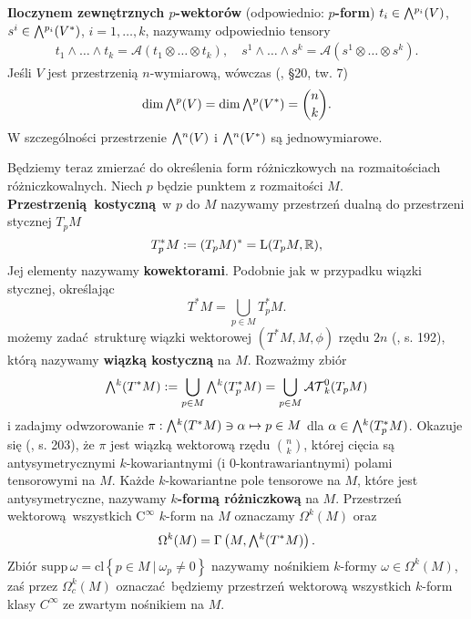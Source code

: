 \textbf{Iloczynem zewnętrznych \(p\)-wektorów} (odpowiednio: \textbf{\(p\)-form}) \(t_i\in\Exterior^{p_i}(V)\), \(s^i\in\Exterior^{p_i}(V^\ast)\), \(i=1,\dots, k\), nazywamy odpowiednio tensory
\begin{align*}
    t_1\wedge\dots\wedge t_k = \mathcal{A}(t_1\otimes \dots \otimes t_k), \quad 
    s^1\wedge\dots\wedge s^k = \mathcal{A}(s^1\otimes \dots \otimes s^k).
\end{align*}
Jeśli \(V\) jest przestrzenią \(n\)-wymiarową, wówczas (\cite{herdegen}, §20, tw. 7)
\begin{equation*}
    \mathrm{dim}\,\Exterior^p(V) = \mathrm{dim}\,\Exterior^p(V^\ast) = \binom{n}{k}.
\end{equation*}
W szczególności przestrzenie \(\Exterior^n(V)\) i \(\Exterior^n(V^\ast)\) są jednowymiarowe. 

Będziemy teraz zmierzać do określenia form różniczkowych na rozmaitościach różniczkowalnych. Niech \(p\) będzie punktem z rozmaitości \(M\). \textbf{Przestrzenią kostyczną} w \(p\) do \(M\) nazywamy przestrzeń dualną do przestrzeni stycznej \(T_p M\)
\begin{equation*}
    T^\ast_p M := (T_p M)^\ast = \mathrm{L}(T_p M, \mathbb{R}),
\end{equation*}
Jej elementy nazywamy \textbf{kowektorami}. Podobnie jak w przypadku wiązki stycznej, określając
\begin{equation*}
    T^\ast M = \bigcup\limits_{p\in M} T_p^\ast M.
\end{equation*}
możemy zadać strukturę wiązki wektorowej \((T^\ast M, M, \phi)\) rzędu \(2n\) (\cite{tu}, s. 192), którą nazywamy \textbf{wiązką kostyczną} na \(M\). 
Rozważmy zbiór
\begin{equation*}
    \Exterior^k(T^\ast M) := \bigcup\limits_{p\in M} \Exterior^k(T^{\ast}_p M) = \bigcup\limits_{p\in M} \mathcal{AT}^0_k(T_p M)
\end{equation*} i zadajmy odwzorowanie \(\pi: \Exterior^k (T^\ast M) \ni \alpha \mapsto p\in M\) dla 
\(\alpha \in \Exterior^k(T^{\ast}_p M)\). Okazuje się (\cite{tu}, s. 203), że \(\pi\) jest wiązką wektorową rzędu \(\binom{n}{k}\), której cięcia są antysymetrycznymi \(k\)-kowariantnymi (i \(0\)-kontrawariantnymi) polami tensorowymi na \(M\).   
Każde \(k\)-kowariantne pole tensorowe na \(M\), które jest antysymetryczne, nazywamy \textbf{\(k\)-formą różniczkową} na \(M\).
Przestrzeń wektorową wszystkich \(\mathrm{C}^\infty\) \(k\)-form na \(M\) oznaczamy \(\Omega^k(M)\) oraz
\begin{equation*}
    \Omega^k(M)=\Gamma\left(M, \Exterior^k(T^\ast M)\right).
\end{equation*}
Zbiór \(\mathrm{supp}\, \omega = \mathrm{cl}\left\{p\in M \: | \: \omega_p \neq 0\right\}\) nazywamy nośnikiem \(k\)-formy \(\omega\in\Omega^k(M)\), zaś przez \(\Omega^k_c(M)\) oznaczać będziemy przestrzeń wektorową wszystkich \(k\)-form klasy \(C^\infty\) ze zwartym nośnikiem na \(M\).


